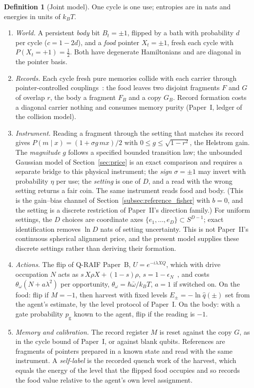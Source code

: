 \documentclass[12pt]{article}
\theoremstyle{definition}
\newtheorem{definition}[theorem]{Definition}
\begin{document}
\begin{definition}[Joint model]
\label{def:joint}
One cycle is one use; entropies are in nats and energies in units of $k_BT$.
\begin{enumerate}
\item[(i)] \emph{World.} A persistent \emph{body} bit $B_t=\pm1$, flipped by a bath with probability $d$ per cycle ($c=1-2d$), and a \emph{food} pointer $X_t=\pm1$, fresh each cycle with $P(X_t=+1)=\tfrac12$. Both have degenerate Hamiltonians and are diagonal in the pointer basis.
\item[(ii)] \emph{Records.} Each cycle fresh pure memories collide with each carrier through pointer-controlled couplings~\cite{Liu2026HAFF_E,Liu2026HAFF_F}: the food leaves two disjoint fragments $F$ and $G$ of overlap $r$, the body a fragment $F_B$ and a copy $G_B$. Record formation costs a diagonal carrier nothing and consumes memory purity (Paper~I, ledger of the collision model).
\item[(iii)] \emph{Instrument.} Reading a fragment through the setting that matches its record gives $P(m\mid x)=(1+\sigma g\,mx)/2$ with $0\le g\le\sqrt{1-r^2}$, the Helstrom gain. The \emph{magnitude} $g$ follows a specified bounded transition law; the unbounded Gaussian model of Section~\ref{sec:price} is an exact comparison and requires a separate bridge to this physical instrument; the \emph{sign} $\sigma=\pm1$ may invert with probability $\eta$ per use; the \emph{setting} is one of $D$, and a read with the wrong setting returns a fair coin. The same instrument reads food and body. (This is the gain--bias channel of Section~\ref{subsec:reference_fisher} with $b=0$, and the setting is a discrete restriction of Paper~II's direction family.)
For uniform settings, the $D$ choices are coordinate axes
$\{e_1,\ldots,e_D\}\subset S^{D-1}$; exact identification removes
$\ln D$ nats of setting uncertainty. This is not Paper~II's continuous spherical alignment
price, and the present model supplies these discrete settings rather
than deriving their formation.
\item[(iv)] \emph{Actions.} The flip of Q-RAIF Paper~B, $U=e^{-i\lambda XQ}$, which with drive occupation $N$ acts as $s\,X\rho X+(1-s)\rho$, $s=1-\epsilon_N$~\cite{Liu2026QRAIF_B}, and costs $\theta_\omega(N+a\lambda^2)$ per opportunity, $\theta_\omega=\hbar\bar\omega/k_BT$, $a=1$ if switched on. On the food: flip if $M=-1$, then harvest with fixed levels $E_\pm=-\ln\hat q(\pm)$ set from the agent's estimate, by the level protocol of Paper~I. On the body: with a gate probability $p_{\mathrm g}$ known to the agent, flip if the reading is $-1$.
\item[(v)] \emph{Memory and calibration.} The record register $M$ is reset against the copy $G$, as in the cycle bound of Paper~I, or against blank qubits. References are fragments of pointers prepared in a known state and read with the same instrument. A \emph{self-label} is the recorded quench work of the harvest, which equals the energy of the level that the flipped food occupies and so records the food value relative to the agent's own level assignment.
\end{enumerate}
\end{definition}
\end{document}
